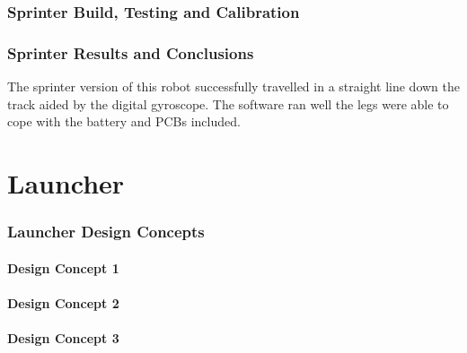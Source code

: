 \clearpage
\section{Sprinter Build, Testing and Calibration}
\label{sec:Sprinter Build, Testing and Calibration}

\clearpage
\section{Sprinter Results and Conclusions}
\label{sec:Sprinter Results and Conclusions}
  The sprinter version of this robot successfully travelled in a straight line down the track aided by the digital gyroscope. The software ran well the legs were able to cope with the battery and PCBs included. %

\clearpage
\part{Launcher}
\label{part:launcher}

\section{Launcher Design Concepts}
\label{sec:Launcher Design Concepts}
  \subsection{Design Concept 1}
  \label{sub:Design Concept 1}

  \subsection{Design Concept 2}
  \label{sub:Design Concept 2}

  \subsection{Design Concept 3}
  \label{sub:Design Concept 3}

